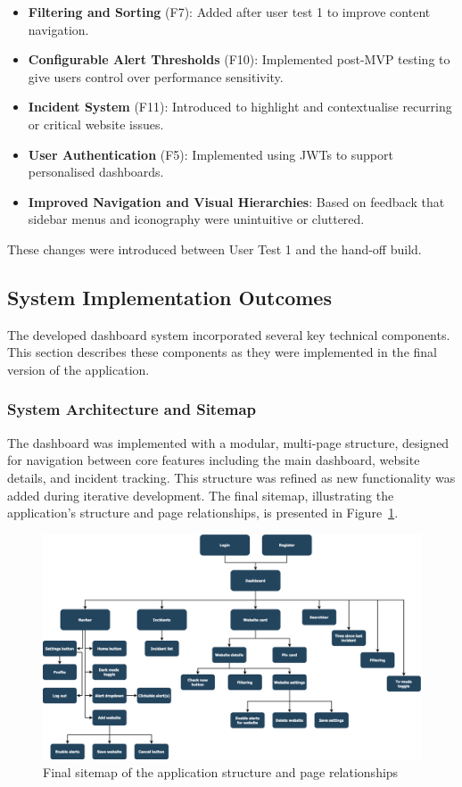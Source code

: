 {\begin{itemize}
    \item \textbf{Filtering and Sorting} (F7): Added after user test 1 to improve content navigation.
    \item \textbf{Configurable Alert Thresholds} (F10): Implemented post-MVP testing to give users control over performance sensitivity.
    \item \textbf{Incident System} (F11): Introduced to highlight and contextualise recurring or critical website issues.
    \item \textbf{User Authentication} (F5): Implemented using JWTs to support personalised dashboards.
    \item \textbf{Improved Navigation and Visual Hierarchies}: Based on feedback that sidebar menus and iconography were unintuitive or cluttered.
\end{itemize}

These changes were introduced between User Test 1 and the hand-off build.

\subsection{System Implementation Outcomes}
\label{sec:sys_implement_outcomes_results}
The developed dashboard system incorporated several key technical components. This section describes these components as they were implemented in the final version of the application.

\subsubsection{System Architecture and Sitemap}
The dashboard was implemented with a modular, multi-page structure, designed for navigation between core features including the main dashboard, website details, and incident tracking. This structure was refined as new functionality was added during iterative development. The final sitemap, illustrating the application's structure and page relationships, is presented in Figure~\ref{fig:sitemap_final}.

\begin{figure}[H]
\centering
\includegraphics[width=\textwidth]{figures/diagrams/sitemap-final.png}
\caption{Final sitemap of the application structure and page relationships}
\label{fig:sitemap_final}
\end{figure}



}

